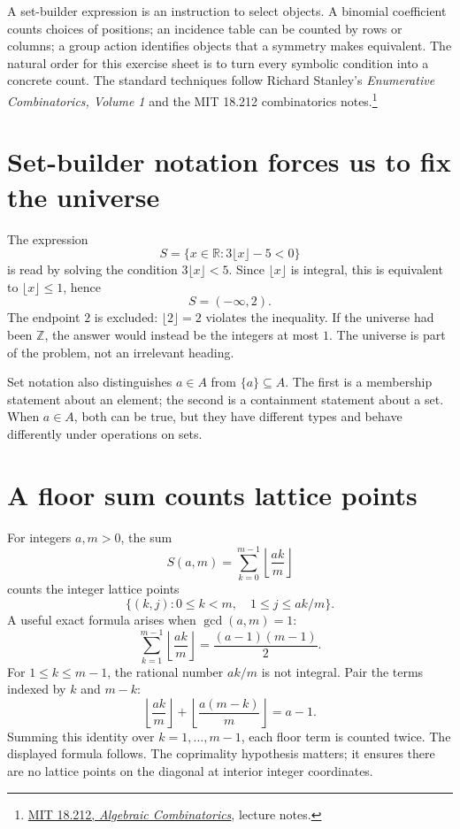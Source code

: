 
A set-builder expression is an instruction to select objects. A binomial coefficient counts choices of positions; an incidence table can be counted by rows or columns; a group action identifies objects that a symmetry makes equivalent. The natural order for this exercise sheet is to turn every symbolic condition into a concrete count. The standard techniques follow Richard Stanley's \emph{Enumerative Combinatorics, Volume 1} and the MIT 18.212 combinatorics notes.\footnote{\href{https://ocw.mit.edu/courses/18-212-algebraic-combinatorics-spring-2019/pages/lecture-notes/}{MIT 18.212, \emph{Algebraic Combinatorics}}, lecture notes.}

\section{Set-builder notation forces us to fix the universe}

The expression
\[
 S=\{x\in\mathbb R:3\lfloor x\rfloor-5<0\}
\]
is read by solving the condition \(3\lfloor x\rfloor<5\). Since \(\lfloor x\rfloor\) is integral, this is equivalent to \(\lfloor x\rfloor\le1\), hence
\[
 S=(-\infty,2).
\]
The endpoint \(2\) is excluded: \(\lfloor2\rfloor=2\) violates the inequality. If the universe had been \(\mathbb Z\), the answer would instead be the integers at most \(1\). The universe is part of the problem, not an irrelevant heading.

Set notation also distinguishes \(a\in A\) from \(\{a\}\subseteq A\). The first is a membership statement about an element; the second is a containment statement about a set. When \(a\in A\), both can be true, but they have different types and behave differently under operations on sets.

\section{A floor sum counts lattice points}

For integers \(a,m>0\), the sum
\[
 S(a,m)=\sum_{k=0}^{m-1}\left\lfloor\frac{ak}{m}\right\rfloor
\]
counts the integer lattice points
\[
 \{(k,j):0\le k<m,\quad 1\le j\le ak/m\}.
\]
A useful exact formula arises when \(\gcd(a,m)=1\):
\[
 \boxed{\sum_{k=1}^{m-1}\left\lfloor\frac{ak}{m}\right\rfloor
 =\frac{(a-1)(m-1)}2.}
\]
For \(1\le k\le m-1\), the rational number \(ak/m\) is not integral. Pair the terms indexed by \(k\) and \(m-k\):
\[
 \left\lfloor\frac{ak}{m}\right\rfloor+
 \left\lfloor\frac{a(m-k)}m\right\rfloor=a-1.
\]
Summing this identity over \(k=1,\ldots,m-1\), each floor term is counted twice. The displayed formula follows. The coprimality hypothesis matters; it ensures there are no lattice points on the diagonal at interior integer coordinates.

